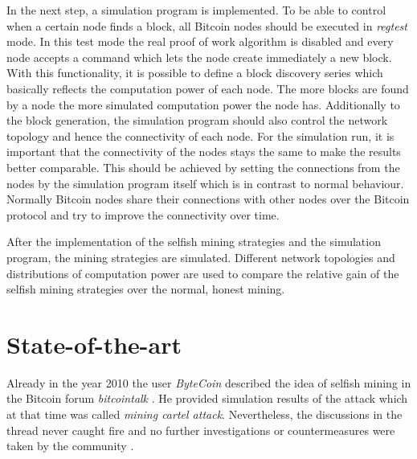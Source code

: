 \documentclass{scrartcl}
\begin{document}
In the next step, a simulation program is implemented.
To be able to control when a certain node finds a block, all Bitcoin nodes should be executed in \textit{regtest} mode.
In this test mode the real proof of work algorithm is disabled and every node accepts a command which lets the node create immediately a new block.
With this functionality, it is possible to define a block discovery series which basically reflects the computation power of each node.
The more blocks are found by a node the more simulated computation power the node has.
Additionally to the block generation, the simulation program should also control the network topology and hence the connectivity of each node.
For the simulation run, it is important that the connectivity of the nodes stays the same to make the results better comparable.
This should be achieved by setting the connections from the nodes by the simulation program itself which is in contrast to normal behaviour.
Normally Bitcoin nodes share their connections with other nodes over the Bitcoin protocol and try to improve the connectivity over time.

After the implementation of the selfish mining strategies and the simulation program, the mining strategies are simulated.
Different network topologies and distributions of computation power are used to compare the relative gain of the selfish mining strategies over the normal, honest mining.

\section{State-of-the-art}
Already in the year 2010 the user \textit{ByteCoin} described the idea of selfish mining in the Bitcoin forum \textit{bitcointalk} \cite{ByteCoin2010}.
He provided simulation results of the attack which at that time was called \textit{mining cartel attack}.
Nevertheless, the discussions in the thread never caught fire and no further investigations or countermeasures were taken by the community \cite{BitcoinTalk2010, bahack2013theoretical}.
\end{document}
